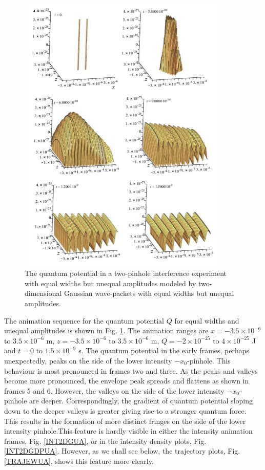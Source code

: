 \documentclass[12pt]{article}       %
\begin{document}
\begin{figure}[h]
\unitlength=1in
\hspace*{1.1in}\includegraphics[width=4in,height=5.33in]  {figure13.jpg}  
\caption{The quantum potential in a two-pinhole interference experiment with  equal widths but unequal amplitudes modeled by  two-dimensional Gaussian wave-packets with equal widths but unequal amplitudes.\label{QPAnimUA}}
\end{figure}
The animation sequence for the quantum potential $Q$ for equal widths and unequal amplitudes is shown in Fig.  \ref{QPAnimUA}. The animation ranges are  $x=-3.5\times 10^{-6}$ to $3.5\times 10^{-6}$ m, $z=-3.5\times 10^{-6}$ to $3.5\times 10^{-6}$ m, $Q=-2\times 10^{-25}$ to $4\times 10^{-25}$ J and $t=0$ to $1.5\times 10^{-9}$ s. The quantum potential in the early frames, perhaps unexpectedly, peaks on the side of the  lower intensity  $-x_0$-pinhole. This behaviour is most pronounced in frames two and three.  As the peaks and valleys become more pronounced, the envelope  peak spreads and flattens as shown in frames 5 and 6. However, the valleys on the side of the lower intensity $-x_0$-pinhole are deeper. Correspondingly, the gradient of quantum potential sloping down to the deeper valleys is greater giving rise to a stronger quantum force. This results in the formation of more distinct fringes  on the side of the lower intensity pinhole.This feature is hardly visible in either the intensity animation frames, Fig.  \ref{INT2DGUA}, or in the intensity density plots, Fig. \ref{INT2DGDPUA}. However, as we shall see below, the trajectory plots, Fig. \ref{TRAJEWUA}, shows this feature more clearly.
\end{document}
